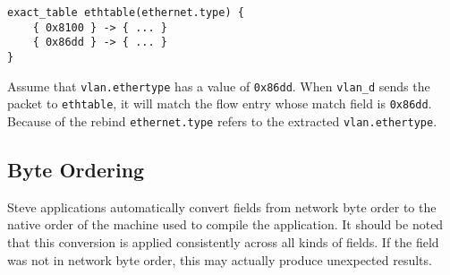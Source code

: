 \begin{codepage}
\begin{lstlisting}
exact_table ethtable(ethernet.type) {
	{ 0x8100 } -> { ... }
	{ 0x86dd } -> { ... }
}
\end{lstlisting}
\end{codepage}

Assume that \texttt{vlan.ethertype} has a value of \texttt{0x86dd}.
When \texttt{vlan\_d} sends the packet to \texttt{ethtable}, it will
match the flow entry whose match field is \texttt{0x86dd}. Because of
the rebind \texttt{ethernet.type} refers to the extracted \texttt{vlan.ethertype}.

\subsection{Byte Ordering}

Steve applications automatically convert fields from network byte order
to the native order of the machine used to compile the application.
It should be noted that this conversion is applied consistently across all kinds of fields. If the field was not in network byte order, this may actually produce unexpected results.


